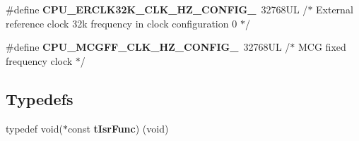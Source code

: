 \begin{DoxyCompactItemize}
\item 
\mbox{\label{group___c_p_u__module_ga092702a75fd1041eb311850abb022240}} 
\#define {\bfseries C\+P\+U\+\_\+\+E\+R\+C\+L\+K32\+K\+\_\+\+C\+L\+K\+\_\+\+H\+Z\+\_\+\+C\+O\+N\+F\+I\+G\+\_}~32768\+U\+L /$\ast$ External reference clock 32k frequency in clock configuration 0 $\ast$/
\item 
\mbox{\label{group___c_p_u__module_gafd8ec2ac4ea47574f95d0e5a6f80807e}} 
\#define {\bfseries C\+P\+U\+\_\+\+M\+C\+G\+F\+F\+\_\+\+C\+L\+K\+\_\+\+H\+Z\+\_\+\+C\+O\+N\+F\+I\+G\+\_}~32768\+U\+L /$\ast$ M\+C\+G fixed frequency clock $\ast$/
\end{DoxyCompactItemize}
\subsection*{Typedefs}
\begin{DoxyCompactItemize}
\item 
\mbox{\label{group___c_p_u__module_gafea04d3e8135767c03ce099f02e97437}} 
typedef void($\ast$const {\bfseries t\+Isr\+Func}) (void)
\end{DoxyCompactItemize}
